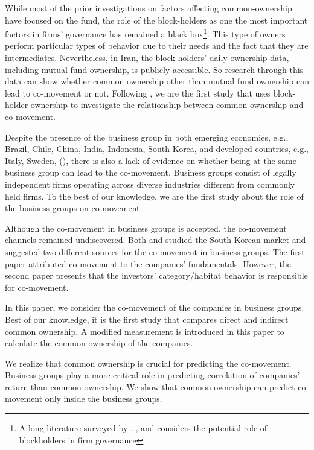	While most of the prior investigations on factors affecting common-ownership have focused on the fund, the role of the block-holders as one the most important factors in firms' governance has remained a black box\footnote{A long literature surveyed by \cite{holderness2003survey}, \cite{edmans2014blockholders}, and \cite{edmans2017blockholders} considers the potential role of blockholders in firm governance}.  This type of owners perform particular types of behavior due to their needs and the fact that they are intermediates.
		Nevertheless, in Iran, the block holders' daily ownership data, including mutual fund ownership, is publicly accessible. So research through this data can show whether common ownership other than mutual fund ownership can lead to co-movement or not. Following \cite{AntonPolk}, we are the first study that uses block-holder ownership to investigate the relationship between common ownership and co-movement.
	
Despite the presence of the business group in both emerging economies, e.g., Brazil, Chile, China, India, Indonesia, South Korea, and developed countries, e.g., Italy, Sweden, (\cite{khanna2007business}), there is also a lack of evidence on whether being at the same business group can lead to the co-movement. Business groups consist of legally independent firms operating across diverse industries different from commonly held firms. To the best of our knowledge, we are the first study about the role of the business groups on co-movement. 





	
	Although the co-movement in business groups is accepted, the co-movement channels remained undiscovered.
	Both {\cite{cho2015stock} and \cite{kim2015stock}} studied the South Korean market and suggested two different sources for the co-movement in business groups. The first paper attributed co-movement to the companies' fundamentals. However, the second paper presents that the investors' category/habitat behavior is responsible for co-movement.
	
	In this paper, we consider the co-movement of the companies in business groups. Best of our knowledge, it is the first study that compares direct and indirect common ownership.
	A modified measurement is introduced in this paper to calculate the common ownership of the companies. 
	
	We realize that common ownership is crucial for predicting the co-movement. Business groups play a more critical role in predicting correlation of companies' return than common ownership. We show that common ownership  can predict  co-movement only inside  the business groups.
	
